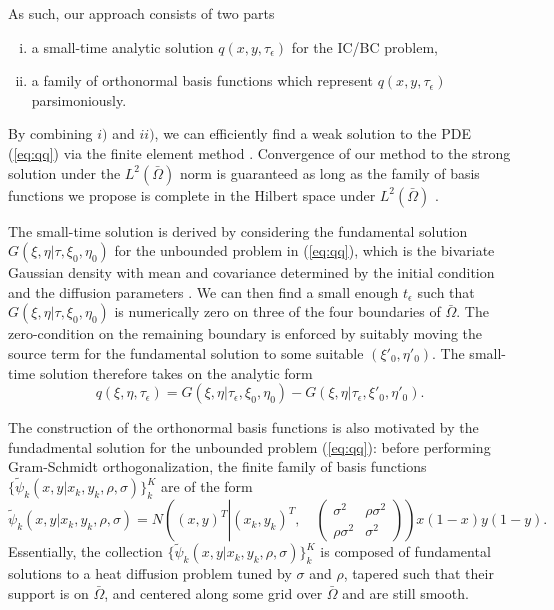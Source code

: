 \documentclass[10pt]{article}
\begin{document}
As such, our approach consists of two parts
\begin{enumerate}[i)]
\item a small-time analytic solution $q(x,y,\tau_\epsilon)$ for the IC/BC problem,
\item a family of orthonormal basis functions which represent
  $q(x,y,\tau_\epsilon)$ parsimoniously.
\end{enumerate}
By combining $i)$ and $ii)$, we can efficiently find a weak solution
to the PDE (\ref{eq:qq}) via the finite element method
\citep{shaidurov2013multigrid}. Convergence of our method to the
strong solution under the $L^2(\bar{\Omega})$ norm is guaranteed as
long as the family of basis functions we propose is complete in the
Hilbert space under $L^2(\bar{\Omega})$ \citep{salsa2016partial}.

The small-time solution is derived by considering the fundamental
solution $G(\xi,\eta |\tau, \xi_0, \eta_0)$ for the unbounded problem
in (\ref{eq:qq}), which is the bivariate Gaussian density with mean
and covariance determined by the initial condition and the diffusion
parameters \citep{stakgold2011green}. We can then find a small enough
$t_\epsilon$ such that $G(\xi,\eta |\tau, \xi_0, \eta_0)$ is
numerically zero on three of the four boundaries of
$\bar{\Omega}$. The zero-condition on the remaining boundary is
enforced by suitably moving the source term for the fundamental
solution to some suitable $(\xi'_0, \eta'_0)$. The small-time solution
therefore takes on the analytic form
\[
  q(\xi,\eta,\tau_\epsilon) = G(\xi,\eta|\tau_\epsilon,\xi_0, \eta_0) - G(\xi,\eta|\tau_\epsilon,\xi'_0, \eta'_0).
\]

The construction of the orthonormal basis functions is also motivated
by the fundadmental solution for the unbounded problem (\ref{eq:qq}):
before performing Gram-Schmidt orthogonalization, the finite family of
basis functions
$\{ \tilde{\psi}_k(x,y| x_k, y_k, \rho, \sigma) \}_{k}^K$ are of the
form
\[
  \tilde{\psi}_k(x,y| x_k, y_k, \rho, \sigma) = N\left( (x,y)^T \left|
      (x_k, y_k)^T , \quad \left( \begin{array}{cc}
                                     \sigma^2 & \rho \sigma^2 \\
                                     \rho \sigma^2 & \sigma^2
                     \end{array} \right) \right. \right) x(1-x)y(1-y).
\]
Essentially, the collection
$\{ \tilde{\psi}_k(x,y| x_k, y_k, \rho, \sigma) \}_{k}^K$ is composed
of fundamental solutions to a heat diffusion problem tuned by $\sigma$
and $\rho$, tapered such that their support is on $\bar{\Omega}$,
and centered along some grid over $\bar{\Omega}$ and are still smooth.
\end{document}
